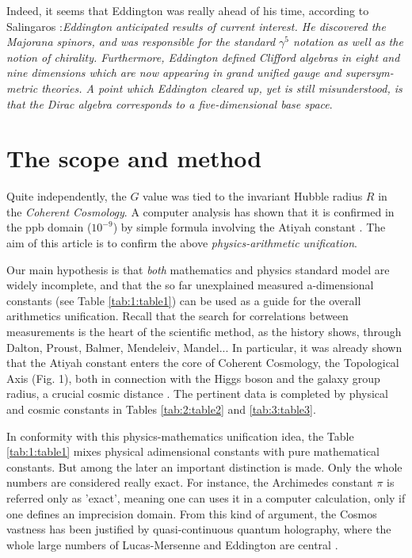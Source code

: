 \documentclass[a4paper,9pt]{article}
\begin{document}
    
Indeed, it seems that Eddington was really ahead of his time, according to Salingaros \cite {Salingaros} :\textit{Eddington anticipated results of current interest. He discovered the Majorana spinors, and was responsible for the standard $\gamma^5$ notation as well as the notion of chirality. Furthermore, Eddington defined Clifford algebras in eight and nine dimensions which are now appearing in grand unified gauge and supersym-metric theories. A point which Eddington cleared up, yet is still misunderstood, is that the Dirac algebra corresponds to a five-dimensional base space}.
       






\section{The scope and method}
   Quite independently, the $G$ value was tied to the invariant Hubble radius $R$ in the \textit {Coherent Cosmology}. A computer analysis has shown that it is confirmed in the ppb domain ($10^{-9}$) by simple formula involving the Atiyah constant \cite{Sanchez}. The aim of this article is to confirm the above \textit {physics-arithmetic unification}.
   
   Our main hypothesis is that \textit{both} mathematics and physics standard model are widely incomplete, and that the so far unexplained measured a-dimensional constants (see Table \ref{tab:1:table1}) can be used as a guide for the overall arithmetics unification. Recall that the search for correlations between measurements is the heart of the scientific method, as the history shows, through Dalton, Proust, Balmer, Mendeleiv, Mandel... In particular, it was already shown that the Atiyah constant enters the core of Coherent Cosmology, the Topological Axis (Fig. 1), both in connection with the Higgs boson and the galaxy group radius, a crucial cosmic distance \cite{Sanchez}. The pertinent data is completed by physical and cosmic constants in Tables \ref{tab:2:table2} and \ref{tab:3:table3}.
   
   
   In conformity with this physics-mathematics unification idea, the Table \ref{tab:1:table1} mixes physical adimensional constants \cite{Tanabashi} with pure mathematical constants. But among the later an important distinction is made. Only the whole numbers are considered really exact. For instance, the Archimedes constant $\pi$ is referred only as 'exact', meaning one can uses it in a computer calculation, only if one defines an imprecision domain. From this kind of argument, the Cosmos vastness has been justified by quasi-continuous quantum holography, where the whole large numbers of Lucas-Mersenne \cite{Bastin} and Eddington \cite{Eddington} are central \cite{Sanchez}.
      
\end{document}
